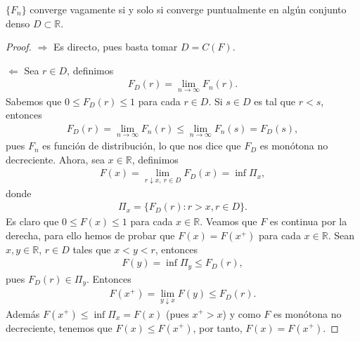 \begin{lema}
    $\{F_n\}$ converge vagamente si y solo si converge puntualmente en algún conjunto denso $D \subset \mathbb{R}$.
\end{lema}

\begin{proof}
    $\boxed{\Longrightarrow}$ Es directo, pues basta tomar $D = C(F)$.

    $\boxed{\Longleftarrow}$ Sea $r \in D$, definimos
    \begin{align*}
        F_D(r) = \lim_{n \to \infty} F_n(r).
    \end{align*}
    Sabemos que $0 \leq F_D(r) \leq 1$ para cada $r \in D$. Si $s \in D$ es tal que $r < s$, entonces
    \begin{align*}
        F_D(r) = \lim_{n \to \infty} F_n(r) \leq \lim_{n \to \infty} F_n(s) = F_D(s),
    \end{align*}
    pues $F_n$ es función de distribución, lo que nos dice que $F_D$ es monótona no decreciente. Ahora, sea $x \in \mathbb{R}$, definimos
    \begin{align*}
        F(x) = \lim_{r \downarrow x, \ r \in D} F_D(x) = \inf \Pi_x,
    \end{align*}
    donde
    \begin{align*}
        \Pi_x = \{ F_D(r) : r > x, r \in D \}.
    \end{align*}
    Es claro que $0 \leq F(x) \leq 1$ para cada $x \in \mathbb{R}$. Veamos que $F$ es continua por la derecha, para ello hemos de probar que $F(x) = F(x^+)$ para cada $x \in \mathbb{R}$. Sean $x,y \in \mathbb{R}$, $r \in D$ tales que $x < y < r$, entonces
    \begin{align*}
        F(y) = \inf \Pi_y \leq F_D(r),
    \end{align*}
    pues $F_D(r) \in \Pi_y$. Entonces
    \begin{align*}
        F(x^+) = \lim_{y \downarrow x} F(y) \leq F_D(r).
    \end{align*}
    Además $F(x^+) \leq \inf \Pi_x = F(x)$ (pues $x^+ > x$) y como $F$ es monótona no decreciente, tenemos que $F(x) \leq F(x^+)$, por tanto, $F(x) = F(x^+)$.


\end{proof}
